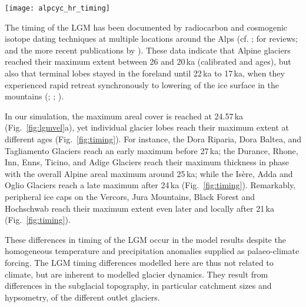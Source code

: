 \documentclass[tc, manuscript]{copernicus}
\begin{document}
    \begin{figure*}[t]
      \centerline{\texttt{[image: alpcyc\_hr\_timing]}}
      \caption{%
        \textbf{(a)} Timing of the LGM given by the modelled age of maximum ice
        thickness throughout the entire simulation (colour mapping) and
        corresponding, ice surface elevation (200\,m contours).
        \textbf{(b)} Temperature offset time-series from the EPICA ice core
        used as palaeo-climate forcing for the ice flow model (black curve),
        and modelled glacierized area during the LGM (coloured curve). The LGM
        is here modelled as a time-transgressive event. In much of the mountain
        area, maximum thickness is reached before 27\,ka.}
      \label{fig:timing}
    \end{figure*}

    The timing of the LGM has been documented by radiocarbon and cosmogenic
    isotope dating techniques at multiple locations around the Alps (cf.
    \citealp{Ivy-Ochs.2015};
    \citealp[Fig.~5]{Wirsig.etal.2016} for reviews; and the more recent
    publications by \citealp{Monegato.etal.2017, Federici.etal.2017}). These
    data indicate that Alpine glaciers reached their maximum extent between 26
    and 20\,ka (calibrated  and  ages), but also
    that terminal lobes stayed in the foreland until 22\,ka to 17\,ka,
    when they experienced rapid retreat synchronously to lowering of the ice
    surface in the mountains (\citealp{Ivy-Ochs.2015}; \citealp[Fig.~5]{Wirsig.etal.2016};
    \citealp[Fig.~3]{Monegato.etal.2017}).

    In our simulation, the maximum areal cover is reached at 24.57\,ka
    (Fig.~\ref{fig:lgmvel}a), yet individual glacier lobes reach their
    maximum extent at different ages (Fig.~\ref{fig:timing}). For instance, the
    Dora Riparia, Dora Baltea, and Tagliamento Glaciers reach an early maximum before
    27\,ka; the Durance, Rhone, Inn, Enns, Ticino, and Adige Glaciers reach
    their maximum thickness in phase with the overall Alpine areal maximum
    around 25\,ka; while the Isère, Adda and Oglio Glaciers reach a late maximum
    after 24\,ka (Fig.~\ref{fig:timing}). Remarkably, peripheral ice caps on
    the Vercors, Jura Mountains, Black Forest and Hochschwab reach their
    maximum extent even later and locally after 21\,ka (Fig.~\ref{fig:timing}).

    These differences in timing of the LGM occur in the model results despite
    the homogeneous temperature and precipitation anomalies supplied as
    palaeo-climate forcing. The LGM timing differences modelled here are
    thus not related to climate, but are inherent to modelled glacier dynamics.
    They result from differences in the subglacial topography, in particular
    catchment sizes and hypsometry, of the different outlet glaciers.
\end{document}
